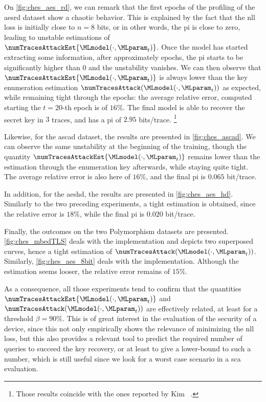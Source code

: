 On \autoref{fig:ches_aes_rd}, we can remark that the first epochs of the profiling of the \gls{aesrd} dataset show a chaotic behavior.
This is explained by the fact that the \gls{nll} loss is initially close to \(n=8\) bits, or in other words, the \gls{pi} is close to zero, leading to unstable estimations of \(\numTracesAttackEst{\MLmodel(\cdot, \MLparam_t)}\). 
Once the model has started extracting some information, \ie{} after approximately epochs, the \gls{pi} starts to be significantly higher than \(0\) and the unstability vanishes. 
We can then observe that \(\numTracesAttackEst{\MLmodel(\cdot, \MLparam_t)}\) is always lower than the key enumeration estimation \(\numTracesAttack(\MLmodel(\cdot, \MLparam_t))\) as expected, while remaining tight through the epochs: the average relative error, computed starting the \(t=20\)-th epoch is of \(16\%\).
The final model is able to recover the secret key in \(3\) traces, and has a \gls{pi} of \(2.95\) bits/trace.%
\footnote{
    Those results coincide with the ones reported by Kim \etal{}~\cite{kim_make_2019}.
}

Likewise, for the \gls{ascad} dataset, the results are presented in \autoref{fig:ches_ascad}.
We can observe the same unstability at the beginning of the training, though the quantity \(\numTracesAttackEst{\MLmodel(\cdot, \MLparam_t)}\) remains lower than the estimation through the enumeration key afterwards, while staying quite tight.
The average relative error is also here of \(16\%\), and the final \gls{pi} is \(0.065\) bit/trace.

In addition, for the \gls{aeshd}, the results are presented in \autoref{fig:ches_aes_hd}.
Similarly to the two preceding experiments, a tight estimation is obtained, since the relative error is \(18\%\), while the final \gls{pi} is \(0.020\) bit/trace.

Finally, the outcomes on the two Polymorphism datasets are presented.
\autoref{fig:ches_mbedTLS} deals with the \mbedTLS{} implementation and depicts two superposed curves, hence a tight estimation of \(\numTracesAttack(\MLmodel(\cdot, \MLparam_t))\).
Similarly, \autoref{fig:ches_aes_8bit} deals with the \aeshuitbit{} implementation.
Although the estimation seems looser, the relative error remains of \(15\%\).

As a consequence, all those experiments tend to confirm that the quantities \(\numTracesAttackEst{\MLmodel(\cdot, \MLparam_t)}\) and \(\numTracesAttack(\MLmodel(\cdot, \MLparam_t))\) are effectively related, at least for a threshold \(\beta = 90\%\).
This is of great interest in the evaluation of the security of a device, since this not only empirically shows the relevance of minimizing the \gls{nll} loss, but this also provides a relevant tool to predict the required number of queries to succeed the key recovery, or at least to give a lower-bound to such a number, which is still useful since we look for a worst case scenario in a \gls{sca} evaluation.
